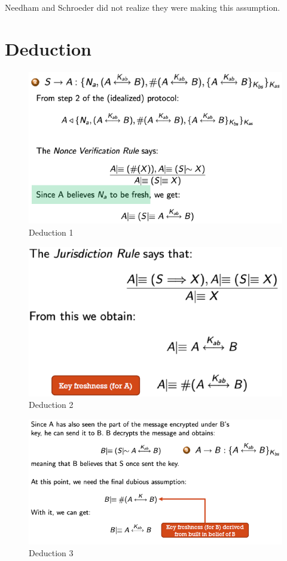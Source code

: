 Needham and Schroeder did not realize they were making this assumption.

\section{Deduction}

\begin{figure}
	\centering
	\includegraphics[width=0.7\linewidth]{Images/Chapter4/deduction1}
	\caption{Deduction 1}
	\label{fig:deduction1}
\end{figure}
\begin{figure}
	\centering
	\includegraphics[width=0.7\linewidth]{Images/Chapter4/deduction2}
	\caption{Deduction 2}
	\label{fig:deduction2}
\end{figure}

\begin{figure}
	\centering
	\includegraphics[width=0.7\linewidth]{Images/Chapter4/deduction3}
	\caption{Deduction 3}
	\label{fig:deduction3}
\end{figure}

